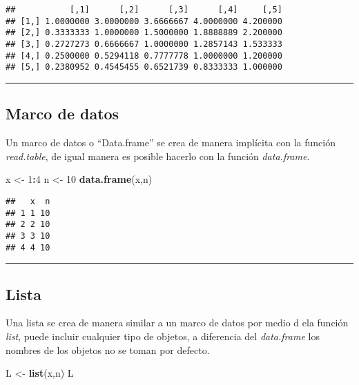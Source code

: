 \documentclass[11pt,]{article}
\newenvironment{Shaded}{\begin{snugshade}}{\end{snugshade}}
\newcommand{\DecValTok}[1]{\textcolor[rgb]{0.00,0.00,0.81}{#1}}
\newcommand{\KeywordTok}[1]{\textcolor[rgb]{0.13,0.29,0.53}{\textbf{#1}}}
\newcommand{\NormalTok}[1]{#1}
\newcommand{\OperatorTok}[1]{\textcolor[rgb]{0.81,0.36,0.00}{\textbf{#1}}}
\newcommand{\StringTok}[1]{\textcolor[rgb]{0.31,0.60,0.02}{#1}}
\begin{document}
\begin{verbatim}
##           [,1]      [,2]      [,3]      [,4]     [,5]
## [1,] 1.0000000 3.0000000 3.6666667 4.0000000 4.200000
## [2,] 0.3333333 1.0000000 1.5000000 1.8888889 2.200000
## [3,] 0.2727273 0.6666667 1.0000000 1.2857143 1.533333
## [4,] 0.2500000 0.5294118 0.7777778 1.0000000 1.200000
## [5,] 0.2380952 0.4545455 0.6521739 0.8333333 1.000000
\end{verbatim}

\begin{center}\rule{0.5\linewidth}{0.5pt}\end{center}

\hypertarget{marco-de-datos}{%
\subsection{Marco de datos}\label{marco-de-datos}}

Un marco de datos o ``Data.frame'' se crea de manera implícita con la
función \emph{read.table}, de igual manera es posible hacerlo con la
función \emph{data.frame}.

\begin{Shaded}
\begin{Highlighting}[]
\NormalTok{x <-}\StringTok{ }\DecValTok{1}\OperatorTok{:}\DecValTok{4}
\NormalTok{n <-}\StringTok{ }\DecValTok{10}
\KeywordTok{data.frame}\NormalTok{(x,n)}
\end{Highlighting}
\end{Shaded}

\begin{verbatim}
##   x  n
## 1 1 10
## 2 2 10
## 3 3 10
## 4 4 10
\end{verbatim}

\begin{center}\rule{0.5\linewidth}{0.5pt}\end{center}

\hypertarget{lista}{%
\subsection{Lista}\label{lista}}

Una lista se crea de manera similar a un marco de datos por medio d ela
función \emph{list}, puede incluir cualquier tipo de objetos, a
diferencia del \emph{data.frame} los nombres de los objetos no se toman
por defecto.

\begin{Shaded}
\begin{Highlighting}[]
\NormalTok{L <-}\StringTok{ }\KeywordTok{list}\NormalTok{(x,n)}
\NormalTok{L}
\end{Highlighting}
\end{Shaded}
\end{document}
